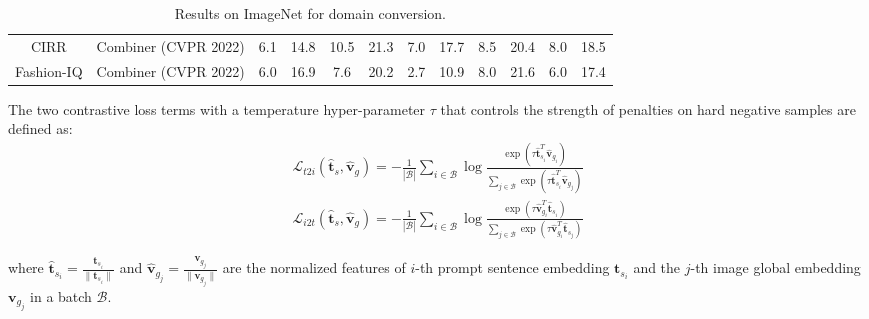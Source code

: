 \documentclass[letterpaper]{article} \usepackage{aaai24}  \usepackage{times}  \usepackage{helvet}  \usepackage{courier}  \usepackage[hyphens]{url}  \usepackage{graphicx} \urlstyle{rm} \def\UrlFont{\rm}  \usepackage{natbib}  \usepackage{caption} \frenchspacing  \setlength{\pdfpagewidth}{8.5in} \setlength{\pdfpageheight}{11in} \usepackage{algorithm}
\begin{document}
\begin{table*}[t]
{\begin{tabular}{cccccccccccc}
CIRR                       & Combiner (CVPR 2022)    & 6.1          & \multicolumn{1}{c|}{14.8}          & 10.5          & \multicolumn{1}{c|}{21.3}          & 7.0           & \multicolumn{1}{c|}{17.7}          & 8.5           & \multicolumn{1}{c|}{20.4}          & 8.0           & 18.5          \\
Fashion-IQ                 & Combiner (CVPR 2022)    & 6.0          & \multicolumn{1}{c|}{16.9}          & 7.6           & \multicolumn{1}{c|}{20.2}          & 2.7           & \multicolumn{1}{c|}{10.9}          & 8.0           & \multicolumn{1}{c|}{21.6}          & 6.0           & 17.4          \\ \bottomrule
\end{tabular}}
\caption{Results on ImageNet for domain conversion.}
\label{tab:imgnet}
\end{table*}

The two contrastive loss terms with a temperature hyper-parameter $\tau$ that controls the strength of penalties on hard negative samples are defined as:
\begin{equation}
\begin{aligned}
\mathcal{L}_{t 2 i}(\hat{\boldsymbol{t}}_s, \hat{\boldsymbol{v}}_g)=-\frac{1}{|\mathcal{B}|} \sum_{i \in \mathcal{B}} \log \frac{\exp \left(\tau \hat{\boldsymbol{t}}_{s_{i}}^{T} \hat{\boldsymbol{v}}_{g_{i}}\right)}{\sum_{j \in \mathcal{B}} \exp \left(\tau \hat{\boldsymbol{t}}_{s_{i}}^{T} \hat{\boldsymbol{v}}_{g_{j}}\right)}
\end{aligned}
\label{f:CTL_1}
\end{equation}
\begin{equation}
\begin{aligned}
\mathcal{L}_{i 2 t}(\hat{\boldsymbol{t}}_s, \hat{\boldsymbol{v}}_g)=-\frac{1}{|\mathcal{B}|} \sum_{i \in \mathcal{B}} \log \frac{\exp \left(\tau \hat{\boldsymbol{v}}_{g_{i}}^{T} \hat{\boldsymbol{t}}_{s_{i}}\right)}{\sum_{j \in \mathcal{B}} \exp \left(\tau \hat{\boldsymbol{v}}_{g_{i}}^{T} \hat{\boldsymbol{t}}_{s_{j}}\right)}
\end{aligned}
\label{f:CTL_2}
\end{equation}


\noindent where $\hat{\boldsymbol{t}}_{s_{i}} = \frac{\boldsymbol{t}_{s_{i}}}{\|\boldsymbol{t}_{s_{i}}\|}$ and $\hat{\boldsymbol{v}}_{g_{j}} = \frac{\boldsymbol{v}_{g_{j}}}{\|\boldsymbol{v}_{g_{j}}\|}$ are the normalized features of $i$-th prompt sentence embedding $\boldsymbol{t}_{s_i}$ and the $j$-th image global embedding $\boldsymbol{v}_{g_{j}}$ in a batch $\mathcal{B}$. 
\end{document}
